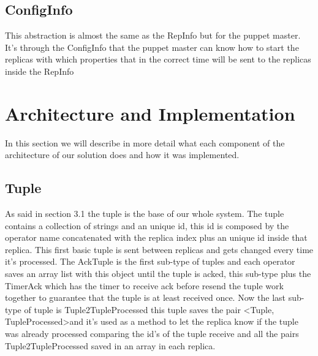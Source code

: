 \documentclass[times, 10pt, twocolumn]{article}
\begin{document}
\subsection{ConfigInfo}
This abstraction is almost the same as the RepInfo but for the puppet master. It's through the ConfigInfo that the puppet master can know how to start the replicas with which properties that in the correct time will be sent to the replicas inside the RepInfo



\section{Architecture and Implementation}
In this section we will describe in more detail what each component of the architecture of our solution does and how it was implemented.




\subsection{Tuple}
As said in section 3.1 the tuple is the base of our whole system. The tuple contains a collection of strings and an unique id, this id is composed by the operator name concatenated with the replica index plus an unique id inside that replica. This first basic tuple is sent between replicas and gets changed every time it's processed. The AckTuple is the first sub-type of tuples and each operator saves an array list with this object until the tuple is acked, this sub-type plus the TimerAck which has the timer to receive ack before resend the tuple work together to guarantee that the tuple is at least received once. Now the last sub-type of tuple is Tuple2TupleProcessed this tuple saves the pair \textless Tuple, TupleProcessed\textgreater and it's used as a method to let the replica know if the tuple was already processed comparing the id's of the tuple receive and all the pairs Tuple2TupleProcessed saved in an array in each replica.



\end{document}

